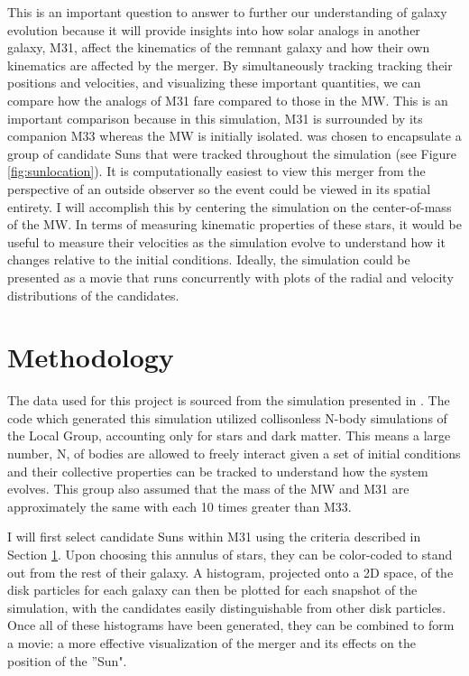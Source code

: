 \documentclass{aastex63}
\begin{document}
This is an important question to answer to further our understanding of galaxy evolution because it will provide insights into how solar analogs in another galaxy, M31, affect the kinematics of the remnant galaxy and how their own kinematics are affected by the merger. By simultaneously tracking tracking their positions and velocities, and visualizing these important quantities, we can compare how the analogs of M31 fare compared to those in the MW. This is an important comparison because in this simulation, M31 is surrounded by its companion M33 whereas the MW is initially isolated.  was chosen to encapsulate a group of candidate Suns that were tracked throughout the simulation (see Figure \ref{fig:sunlocation}). It is computationally easiest to view this merger from the perspective of an outside observer so the event could be viewed in its spatial entirety. I will accomplish this by centering the simulation on the center-of-mass of the MW. In terms of measuring kinematic properties of these stars, it would be useful to measure their velocities as the simulation evolve to understand how it changes relative to the initial conditions. Ideally, the simulation could be presented as a movie that runs concurrently with plots of the radial and velocity distributions of the candidates.

\section{Methodology} \label{sec:proposal}
The data used for this project is sourced from the simulation presented in \cite{2012ApJ...753....9V}. The code which generated this simulation utilized collisonless N-body simulations of the Local Group, accounting only for stars and dark matter. This means a large number, N, of bodies are allowed to freely interact given a set of initial conditions and their collective properties can be tracked to understand how the system evolves. This group also assumed that the mass of the MW and M31 are approximately the same with each 10 times greater than M33.

I will first select candidate Suns within M31 using the criteria described in Section \ref{sec:proposal}. Upon choosing this annulus of stars, they can be color-coded to stand out from the rest of their galaxy. A histogram, projected onto a 2D space, of the disk particles for each galaxy can then be plotted for each snapshot of the simulation, with the candidates easily distinguishable from other disk particles. Once all of these histograms have been generated, they can be combined to form a movie: a more effective visualization of the merger and its effects on the position of the ''Sun".
\end{document}
